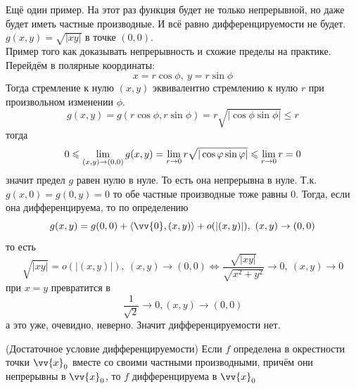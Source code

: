 \begin{example}
	Ещё один пример. На этот раз функция будет не только непрерывной, но даже будет иметь частные производные. И всё равно дифференцируемости не будет. $g(x, y) = \sqrt{|xy|}$ в точке $(0, 0)$. \\
	Пример того как доказывать непрерывность и схожие пределы на практике.
	Перейдём в полярные координаты:
	\[
		x = r \cos \phi, \  
		y = r \sin \phi
	\]
	Тогда стремление к нулю $(x, y)$ эквивалентно стремлению к нулю $r$ при произвольном изменении $\phi$. 
	\[
		g(x,y) = g(r \cos \phi, r \sin \phi) = r \sqrt{|\cos \phi \sin \phi|} \le r
	\]
	тогда
	\[
		0\leqslant\lim\limits_{ (x,y) \to (0,0)}g(x,y) = \lim\limits_{r \to 0}r \sqrt{|\cos \varphi \sin \varphi|} \leqslant \lim\limits_{r \to 0}r = 0
	\]
	значит предел $g$ равен нулю в нуле. То есть она непрерывна в нуле. Т.к. $g(x, 0)=g (0, y) = 0$ то обе частные производные тоже равны $0$.
	Тогда, если она дифференцируема, то по определению
	\[
		g(x, y) = g(0,0) + \trbr{\vv{0}, (x,y)} + o(|(x,y)|), \ (x,y) \to (0,0)
	\]
	то есть
	\[
	 \sqrt{|xy|} = o(|(x,y)|), \ (x,y) \to (0,0) \Leftrightarrow \frac{\sqrt{|xy|}}{\sqrt{x^2 + y^2}} \to 0,\ (x,y) \to 0
	\]
	при $x=y$ превратится в
	\[
		\frac{1}{\sqrt{2}} \to 0, (x,y) \to (0,0)
	\]
	а это уже, очевидно, неверно.
	Значит дифференцируемости нет.
\end{example}

\begin{theorem} (Достаточное условие дифференцируемости)
	Если $f$ определена в окрестности точки $\vv{x}_0$ вместе со своими частными производными, причём они непрерывны в $\vv{x}_0$, то $f$ дифференцируема в $\vv{x}_0$
\end{theorem}

